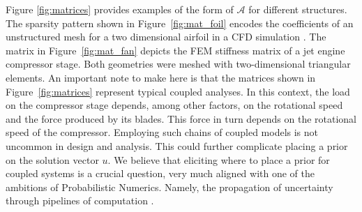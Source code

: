 \documentclass[twoside]{article}
\begin{document}
		Figure \ref{fig:matrices} provides examples of the form of $\mathcal{A}$ for different structures. The sparsity pattern shown in Figure~\ref{fig:mat_foil} encodes the coefficients of an unstructured mesh for a two dimensional airfoil in a CFD simulation \cite{Davis:2011}. The matrix in Figure~\ref{fig:mat_fan} depicts the FEM stiffness matrix of a jet engine compressor stage. Both geometries were meshed with two-dimensional triangular elements. An important note to make here is that the matrices shown in Figure~\ref{fig:matrices} represent typical coupled analyses. In this context, the load on the compressor stage depends, among other factors, on the rotational speed and the force produced by its blades. This force in turn depends on the rotational speed of the compressor. %
		Employing such chains of coupled models is not uncommon in design and analysis. This could further complicate placing a prior on the solution vector $u$. We believe that eliciting where to place a prior for coupled systems is a crucial question, very much aligned with one of the ambitions of Probabilistic Numerics. Namely, the propagation of uncertainty through pipelines of computation \cite{PN15}.
\end{document}
